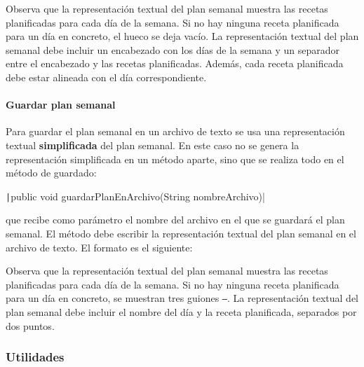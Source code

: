 \documentclass[
    a4paper, %
    12pt, %
]{CSSullivanBusinessReport}
\begin{document}
Observa que la representación textual del plan semanal muestra las recetas planificadas para cada día de la semana. Si no hay ninguna receta planificada para un día en concreto, el hueco se deja vacío. La representación textual del plan semanal debe incluir un encabezado con los días de la semana y un separador entre el encabezado y las recetas planificadas. Además, cada receta planificada debe estar alineada con el día correspondiente.

\paragraph{Guardar plan semanal}

Para guardar el plan semanal en un archivo de texto se usa una representación textual \textbf{simplificada} del plan semanal. En este caso no se genera la representación simplificada en un método aparte, sino que se realiza todo en el método de guardado:

\texttt|public void guardarPlanEnArchivo(String nombreArchivo)|

que recibe como parámetro el nombre del archivo en el que se guardará el plan semanal. El método debe escribir la representación textual del plan semanal en el archivo de texto. El formato es el siguiente:


Observa que la representación textual del plan semanal muestra las recetas planificadas para cada día de la semana. Si no hay ninguna receta planificada para un día en concreto, se muestran tres guiones \texttt{---}. La representación textual del plan semanal debe incluir el nombre del día y la receta planificada, separados por dos puntos.

\subsubsection{Utilidades}
\end{document}
